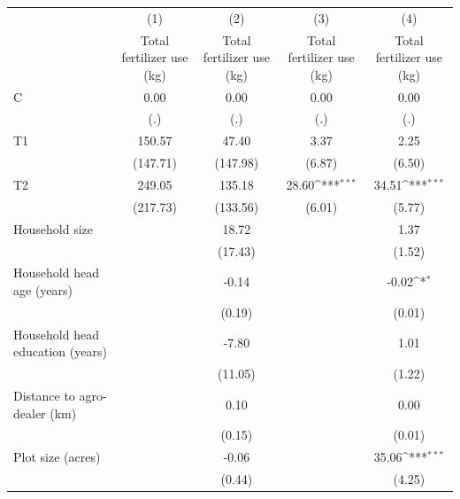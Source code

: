 {
\def\sym#1{\ifmmode^{#1}\else\(^{#1}\)\fi}
\begin{tabular}{l*{4}{c}}
\hline\hline
                &\multicolumn{1}{c}{(1)}&\multicolumn{1}{c}{(2)}&\multicolumn{1}{c}{(3)}&\multicolumn{1}{c}{(4)}\\
                &\multicolumn{1}{c}{Total fertilizer use (kg)}&\multicolumn{1}{c}{Total fertilizer use (kg)}&\multicolumn{1}{c}{Total fertilizer use (kg)}&\multicolumn{1}{c}{Total fertilizer use (kg)}\\
\hline
C               &     0.00         &     0.00         &     0.00         &     0.00         \\
                &      (.)         &      (.)         &      (.)         &      (.)         \\
T1              &   150.57         &    47.40         &     3.37         &     2.25         \\
                & (147.71)         & (147.98)         &   (6.87)         &   (6.50)         \\
T2              &   249.05         &   135.18         &    28.60\sym{***}&    34.51\sym{***}\\
                & (217.73)         & (133.56)         &   (6.01)         &   (5.77)         \\
Household size  &                  &    18.72         &                  &     1.37         \\
                &                  &  (17.43)         &                  &   (1.52)         \\
Household head age (years)&                  &    -0.14         &                  &    -0.02\sym{*}  \\
                &                  &   (0.19)         &                  &   (0.01)         \\
Household head education (years)&                  &    -7.80         &                  &     1.01         \\
                &                  &  (11.05)         &                  &   (1.22)         \\
Distance to agro-dealer (km)&                  &     0.10         &                  &     0.00         \\
                &                  &   (0.15)         &                  &   (0.01)         \\
Plot size (acres)&                  &    -0.06         &                  &    35.06\sym{***}\\
                &                  &   (0.44)         &                  &   (4.25)         \\

\end{tabular}}
